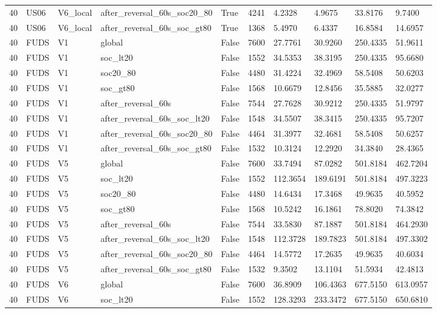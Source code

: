 \begin{tabular}{llllllllll}
40 & US06 & V6\_local & after\_reversal\_60s\_soc20\_80 & True & 4241 & 4.2328 & 4.9675 & 33.8176 & 9.7400 \\
40 & US06 & V6\_local & after\_reversal\_60s\_soc\_gt80 & True & 1368 & 5.4970 & 6.4337 & 16.8584 & 14.6957 \\
40 & FUDS & V1 & global & False & 7600 & 27.7761 & 30.9260 & 250.4335 & 51.9611 \\
40 & FUDS & V1 & soc\_lt20 & False & 1552 & 34.5353 & 38.3195 & 250.4335 & 95.6680 \\
40 & FUDS & V1 & soc20\_80 & False & 4480 & 31.4224 & 32.4969 & 58.5408 & 50.6203 \\
40 & FUDS & V1 & soc\_gt80 & False & 1568 & 10.6679 & 12.8456 & 35.5885 & 32.0277 \\
40 & FUDS & V1 & after\_reversal\_60s & False & 7544 & 27.7628 & 30.9212 & 250.4335 & 51.9797 \\
40 & FUDS & V1 & after\_reversal\_60s\_soc\_lt20 & False & 1548 & 34.5507 & 38.3415 & 250.4335 & 95.7207 \\
40 & FUDS & V1 & after\_reversal\_60s\_soc20\_80 & False & 4464 & 31.3977 & 32.4681 & 58.5408 & 50.6257 \\
40 & FUDS & V1 & after\_reversal\_60s\_soc\_gt80 & False & 1532 & 10.3124 & 12.2920 & 34.3840 & 28.4365 \\
40 & FUDS & V5 & global & False & 7600 & 33.7494 & 87.0282 & 501.8184 & 462.7204 \\
40 & FUDS & V5 & soc\_lt20 & False & 1552 & 112.3654 & 189.6191 & 501.8184 & 497.3223 \\
40 & FUDS & V5 & soc20\_80 & False & 4480 & 14.6434 & 17.3468 & 49.9635 & 40.5952 \\
40 & FUDS & V5 & soc\_gt80 & False & 1568 & 10.5242 & 16.1861 & 78.8020 & 74.3842 \\
40 & FUDS & V5 & after\_reversal\_60s & False & 7544 & 33.5830 & 87.1887 & 501.8184 & 464.2930 \\
40 & FUDS & V5 & after\_reversal\_60s\_soc\_lt20 & False & 1548 & 112.3728 & 189.7823 & 501.8184 & 497.3302 \\
40 & FUDS & V5 & after\_reversal\_60s\_soc20\_80 & False & 4464 & 14.5772 & 17.2635 & 49.9635 & 40.6034 \\
40 & FUDS & V5 & after\_reversal\_60s\_soc\_gt80 & False & 1532 & 9.3502 & 13.1104 & 51.5934 & 42.4813 \\
40 & FUDS & V6 & global & False & 7600 & 36.8909 & 106.4363 & 677.5150 & 613.0957 \\
40 & FUDS & V6 & soc\_lt20 & False & 1552 & 128.3293 & 233.3472 & 677.5150 & 650.6810 \\

\end{tabular}
